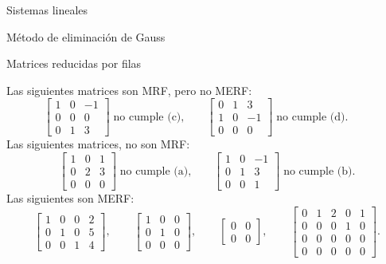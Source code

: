 \begin{chapter}{Sistemas lineales}
\begin{section}{Método de eliminación de Gauss }
\begin{subsection}{Matrices reducidas por filas}
                \begin{ejemplo*} Las siguientes matrices son MRF, pero  no MERF:
                    \begin{equation*}
                    \begin{bmatrix}1 & 0& -1 \\  0&0&0\\ 0&1&3 \end{bmatrix}\;  \text{no cumple (c),} \qquad
                    \begin{bmatrix} 0&1&3 \\1 & 0& -1\\  0&0&0 \end{bmatrix}\; \text{no cumple (d).} \qquad
                    \end{equation*}
                    Las siguientes matrices, no son MRF:
                    \begin{equation*}
                    \begin{bmatrix}1 & 0& 1 \\ 0&2&3\\  0&0&0 \end{bmatrix}\; \text{no cumple (a),} \qquad
                    \begin{bmatrix}1 & 0& -1 \\ 0&1&3\\  0&0&1 \end{bmatrix}\; \text{no cumple (b)}. 
                    \end{equation*}
                    Las siguientes son MERF:
                    \begin{equation*}
                    \begin{bmatrix} 1&0&0&2 \\ 0&1&0&5 \\ 0&0&1&4\end{bmatrix}, \qquad
                    \begin{bmatrix} 1&0&0 \\ 0&1&0 \\ 0&0&0\end{bmatrix}, \qquad
                    \begin{bmatrix} 0&0 \\ 0&0\end{bmatrix}, \qquad
                    \begin{bmatrix} 0&1&2&0&1 \\ 0&0&0&1&0 \\ 0&0&0&0&0 \\ 0&0&0&0&0\end{bmatrix}.
                    \end{equation*}
                \end{ejemplo*}
                

\end{subsection}
\end{section}
\end{chapter}
